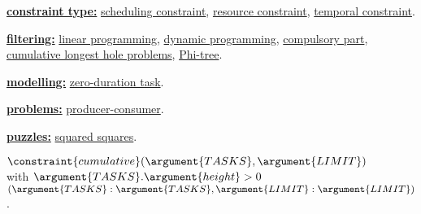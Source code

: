 \begin{ctrdesc}
\hyperlink{constraint_type}{{\bf constraint type:}}
\hyperlink{scheduling_constraint}{scheduling constraint},
\hyperlink{resource_constraint}{resource constraint},
\hyperlink{temporal_constraint}{temporal constraint}.
 
\hyperlink{filtering}{{\bf filtering:}}
\hyperlink{linear_programming}{linear programming},
\hyperlink{dynamic_programming}{dynamic programming},
\hyperlink{compulsory_part}{compulsory part},
\hyperlink{cumulative_longest_hole_problems}{cumulative longest hole problems},
\hyperlink{Phi_tree}{Phi-tree}.
 
\hyperlink{modelling}{{\bf modelling:}}
\hyperlink{zero_duration_task}{zero-duration task}.
 
\hyperlink{problems}{{\bf problems:}}
\hyperlink{producer-consumer}{producer-consumer}.
 
\hyperlink{puzzles}{{\bf puzzles:}}
\hyperlink{squared_squares}{squared squares}.
 
\item[\pdfmarkup{subject={Cond. implications},color=white,markup=Highlight}{Cond. implications}{Conditional implications.}]
\begin{minipage}[t]{11.2cm}
\hspace*{1pt}
$\constraint{cumulative}(\argument{TASKS},\argument{LIMIT})$\\
 \hspace*{10pt} with\hspace*{3pt} $\argument{TASKS}.\argument{height}>0$\\
\hspace*{7pt}{\bf implies}\hspace*{1pt} $ $\hyperlink{Ccoloured_cumulative}{}$(\argument{TASKS}:\argument{TASKS},\argument{LIMIT}:\argument{LIMIT})$.
\end{minipage}
\vspace{0.16cm}


\end{ctrdesc}
